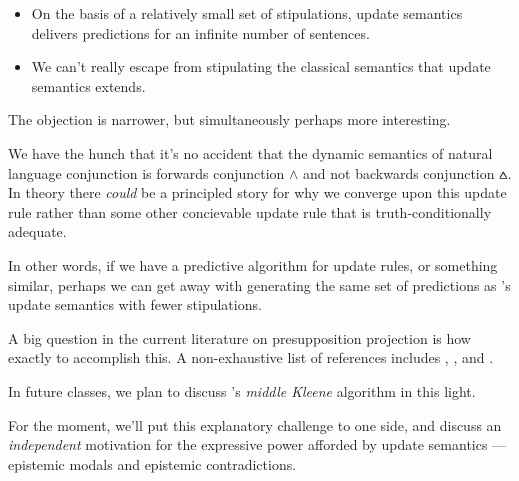 \documentclass[nols,twoside,nofonts,nobib,nohyper]{tufte-handout}
\theoremstyle{definition}
\begin{document}
\begin{itemize}

    \item On the basis of a relatively small set of stipulations, update semantics delivers predictions for an infinite number of sentences.

    \item We can't really escape from stipulating the classical semantics that update semantics extends.

\end{itemize}

The objection is narrower, but simultaneously perhaps more interesting.

We have the hunch that it's no accident that the dynamic semantics of natural language conjunction is forwards conjunction $∧$ and not backwards conjunction $\wedgebar$. In theory there \textit{could} be a principled story for why we converge upon this update rule rather than some other concievable update rule that is truth-conditionally adequate.

In other words, if we have a predictive algorithm for update rules, or something similar, perhaps we can get away with generating the same set of predictions as \citeauthor{Heim1983}'s update semantics with fewer stipulations.

A big question in the current literature on presupposition projection is how exactly to accomplish this. A non-exhaustive list of references includes \cite{George2007,George2008,George2014}, \cite{Schlenker2008,Schlenker2009,Schlenker2010}, and \cite{Fox2013}.

In future classes, we plan to discuss \citeauthor{George2007}'s \textit{middle Kleene} algorithm in this light.

For the moment, we'll put this explanatory challenge to one side, and discuss an \textit{independent} motivation for the expressive power afforded by update semantics --- epistemic modals and epistemic contradictions.
\end{document}
